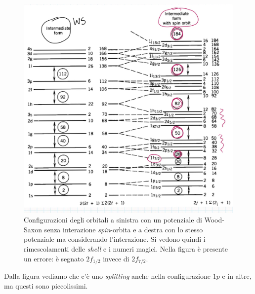 \begin{figure}[h]
    \centering
    \includegraphics[scale=0.3]{Immagini/shell2.png}
    \caption{Configurazioni degli orbitali a sinistra con un potenziale di Wood-Saxon senza interazione \textit{spin}-orbita e a destra con lo stesso potenziale ma considerando l'interazione. Si vedono quindi i rimescolamenti delle \textit{shell} e i numeri magici. Nella figura è presente un errore: è segnato $2f_{1/2}$ invece di $2f_{7/2}$.}
    \label{shellmix}
\end{figure}
\noindent Dalla figura vediamo che c'è uno \textit{splitting} anche nella configurazione $1p$ e in altre, ma questi sono piccolissimi.


